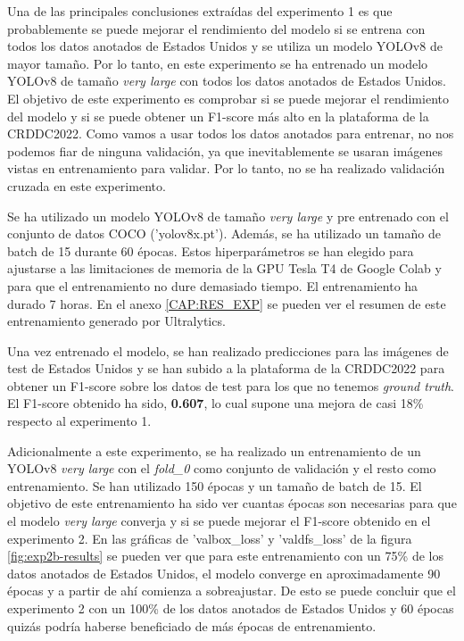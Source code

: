 Una de las principales conclusiones extraídas del experimento 1 es que probablemente se puede mejorar el rendimiento del modelo si se entrena con todos los datos anotados de Estados Unidos y se utiliza un modelo YOLOv8 de mayor tamaño. Por lo tanto, en este experimento se ha entrenado un modelo YOLOv8 de tamaño \textit{very large} con todos los datos anotados de Estados Unidos. El objetivo de este experimento es comprobar si se puede mejorar el rendimiento del modelo y si se puede obtener un F1-score más alto en la plataforma de la CRDDC2022. Como vamos a usar todos los datos anotados para entrenar, no nos podemos fiar de ninguna validación, ya que inevitablemente se usaran imágenes vistas en entrenamiento para validar. Por lo tanto, no se ha realizado validación cruzada en este experimento.

Se ha utilizado un modelo YOLOv8 de tamaño \textit{very large} y pre entrenado con el conjunto de datos COCO ('yolov8x.pt'). Además, se ha utilizado un tamaño de batch de 15 durante 60 épocas. Estos hiperparámetros se han elegido para ajustarse a las limitaciones de memoria de la GPU Tesla T4 de Google Colab y para que el entrenamiento no dure demasiado tiempo. El entrenamiento ha durado 7 horas. En el anexo \ref{CAP:RES_EXP} se pueden ver el resumen de este entrenamiento generado por Ultralytics.

Una vez entrenado el modelo, se han realizado predicciones para las imágenes de test de Estados Unidos y se han subido a la plataforma de la CRDDC2022 para obtener un F1-score sobre los datos de test para los que no tenemos \textit{ground truth}. El F1-score obtenido ha sido, \textbf{0.607}, lo cual supone una mejora de casi 18\% respecto al experimento 1.

Adicionalmente a este experimento, se ha realizado un entrenamiento de un YOLOv8 \textit{very large} con el \textit{fold\_0} como conjunto de validación y el resto como entrenamiento. Se han utilizado 150 épocas y un tamaño de batch de 15. El objetivo de este entrenamiento ha sido ver cuantas épocas son necesarias para que el modelo \textit{very large} converja y si se puede mejorar el F1-score obtenido en el experimento 2. En las gráficas de 'val\/box\_loss' y 'val\/dfs\_loss' de la figura \ref{fig:exp2b-results} se pueden ver que para este entrenamiento con un 75\% de los datos anotados de Estados Unidos, el modelo converge en aproximadamente 90 épocas y a partir de ahí comienza a sobreajustar. De esto se puede concluir que el experimento 2 con un 100\% de los datos anotados de Estados Unidos y 60 épocas quizás podría haberse beneficiado de más épocas de entrenamiento.

